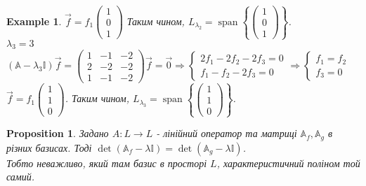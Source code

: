 \documentclass[a4paper, 10pt]{article}
\theoremstyle{theoremdd}
\newtheorem{example}[theorem]{Example}
\newtheorem{proposition}[theorem]{Proposition}
\DeclareMathOperator{\linspan}{span}
\begin{document}
\begin{example}
$\vec{f} = f_1 \begin{pmatrix}
1 \\ 0 \\ 1
\end{pmatrix}$ Таким чином, $L_{\lambda_2} = \linspan\left\{ \begin{pmatrix}
1 \\ 0 \\ 1
\end{pmatrix} \right\}$.
\bigskip \\
$\lambda_3 = 3$\\
$(\mathbb{A} - \lambda_3 \mathbb{I})\vec{f} =\begin{pmatrix}
1 & -1 & -2 \\
2 & -2 & -2 \\
1 & -1 & -2
\end{pmatrix} \vec{f} = \vec{0} \Rightarrow \begin{cases} 2f_1 - 2f_2 - 2f_3 = 0 \\ f_1 - f_2 - 2f_3 = 0 \end{cases} \Rightarrow \begin{cases} f_1 = f_2 \\ f_3 = 0 \end{cases}$\\
$\vec{f} = f_1 \begin{pmatrix}
1 \\ 1 \\ 0
\end{pmatrix}$. Таким чином, $L_{\lambda_3} = \linspan\left\{ \begin{pmatrix}
1 \\ 1 \\ 0
\end{pmatrix} \right\}$.
\end{example}

\begin{proposition}
\label{change_of_basis_characteristic_polynomial}
Задано $A \colon L \to L$ - лінійний оператор та матриці $\mathbb{A}_f, \mathbb{A}_g$ в різних базисах. Тоді $\det(\mathbb{A}_f - \lambda \mathbb{I}) = \det(\mathbb{A}_g - \lambda \mathbb{I})$.\\
Тобто неважливо, який там базис в просторі $L$, характеристичний поліном той самий.
\end{proposition}
\end{document}
